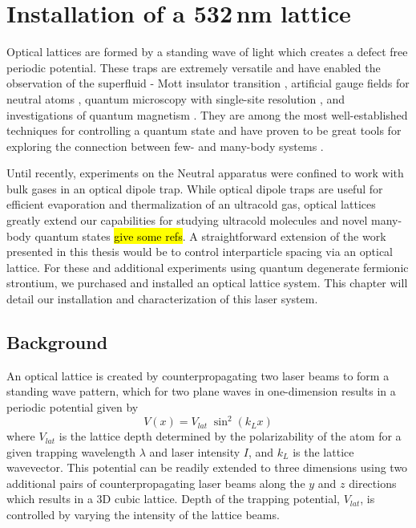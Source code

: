 \chapter{Installation of a 532\,nm lattice} \label{ch:chap6}
	
Optical lattices are formed by a standing wave of light which creates a defect free periodic potential.
These traps are extremely versatile and have enabled the observation of the superfluid - Mott insulator transition \hl{\cite{Greiner2002}}, artificial gauge fields for neutral atoms \hl{\cite{Lin2011}}, quantum microscopy with single-site resolution \hl{\cite{Bakr2009}}, and investigations of quantum magnetism \hl{\cite{Hart2015,Greif2015}}. 
They are among the most well-established techniques for controlling a quantum state and have proven to be great tools for exploring the connection between few- and many-body systems \hl{\cite{Bloch2008}}.

Until recently, experiments on the Neutral apparatus were confined to work with bulk gases in an optical dipole trap.
While optical dipole traps are useful for efficient evaporation and thermalization of an ultracold gas, optical lattices greatly extend our capabilities for studying ultracold molecules and novel many-body quantum states \hl{give some refs}.
A straightforward extension of the work presented in this thesis would be to control interparticle spacing via an optical lattice. 
For these and additional experiments using quantum degenerate fermionic strontium, we purchased and installed an optical lattice system. 
This chapter will detail our installation and characterization of this laser system.

\section{Background} \label{sec:latBackground}
An optical lattice is created by counterpropagating two laser beams to form a standing wave pattern, which for two plane waves in one-dimension results in a periodic potential given by 
	\begin{equation} \label{eq:1dlattice}
		 V(x) = V_{lat} \; \sin^2(k_L x)
	\end{equation}
where $V_{lat}$ is the lattice depth determined by the polarizability of the atom for a given trapping wavelength $\lambda$ and laser intensity $I$, and $k_L$ is the lattice wavevector.
This potential can be readily extended to three dimensions using two additional pairs of counterpropagating laser beams along the $y$ and $z$ directions which results in a 3D cubic lattice.
Depth of the trapping potential, $V_{lat}$, is controlled by varying the intensity of the lattice beams.

